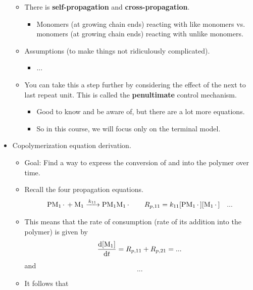 \documentclass[../notes.tex]{subfiles}
\begin{document}
\begin{itemize}
\begin{itemize}
        \item There is \textbf{self-propagation} and \textbf{cross-propagation}.
        \begin{itemize}
            \item Monomers (at growing chain ends) reacting with like monomers vs. monomers (at growing chain ends) reacting with unlike monomers.
        \end{itemize}
        \item Assumptions (to make things not ridiculously complicated).
        \begin{itemize}
            \item ...
        \end{itemize}
        \item You can take this a step further by considering the effect of the next to last repeat unit. This is called the \textbf{penultimate} control mechanism.
        \begin{itemize}
            \item Good to know and be aware of, but there are a lot more equations.
            \item So in this course, we will focus only on the terminal model.
        \end{itemize}
    \end{itemize}
    \item Copolymerization equation derivation.
    \begin{itemize}
        \item Goal: Find a way to express the conversion of  and  into the polymer over time.
        \item Recall the four propagation equations.
        \begin{align*}
            \ce{PM_1* + M_1} &\ce{->[$k_{11}$]} \ce{PM_1M_1*}\tag*{$R_{p,11}=k_{11}[\ce{PM_1*}][\ce{M_1*}]$}
            &...
        \end{align*}
        \item This means that the rate of  consumption (rate of its addition into the polymer) is given by
        \begin{equation*}
            \dv{[\ce{M_1}]}{t} = R_{p,11}+R_{p,21} = ...
        \end{equation*}
        and
        \begin{equation*}
            ...
        \end{equation*}
        \item It follows that
        \begin{equation*}

\end{equation*}
\end{itemize}
\end{itemize}
\end{document}

